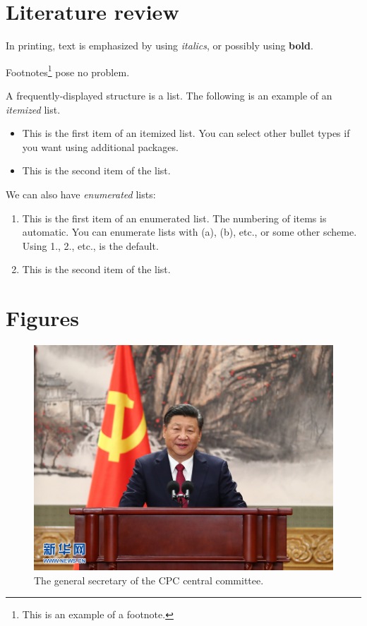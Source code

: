 \documentclass[a4paper,11pt]{article}
\begin{document}
\section{Literature review}

In printing, text is emphasized by using \emph{italics}, or possibly using \textbf{bold}.

Footnotes\footnote{This is an example of a footnote.} pose no problem.

A frequently-displayed structure is a list. The following is an example of an \emph{itemized} list.
\begin{itemize}
   \item  This is the first item of an itemized list. You can select other bullet types if you want using additional packages.

   \item  This is the second item of the list.
\end{itemize}
We can also have \emph{enumerated} lists:
\begin{enumerate}
  \item This is the first item of an enumerated list. The numbering of items is automatic. You can enumerate lists with (a), (b), etc., or some other scheme. Using 1., 2., etc., is the default.

  \item This is the second item of the list. 
\end{enumerate}

\section{Figures}


\begin{figure}[h!]
  \includegraphics[width=\linewidth]{./figures/19-1.jpg}
  \caption{The general secretary of the CPC central committee.}
  \label{fig:fig1}
\end{figure}
\end{document}
